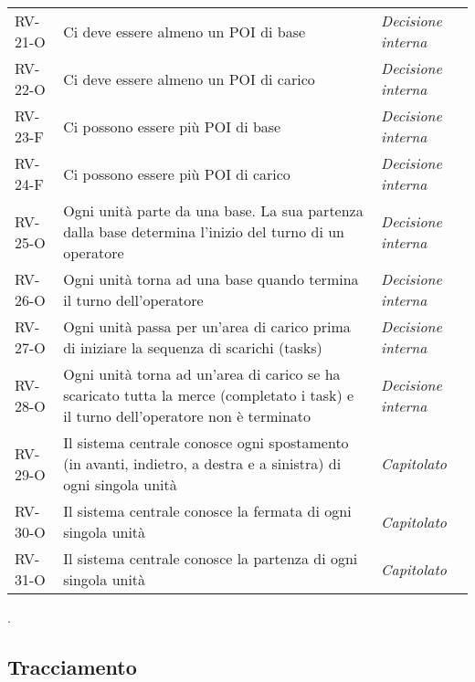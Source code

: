 \begin{longtable}{ 
		>{\centering}p{} 
		>{}p{}
		>{\centering \it}p{} }
RV-21-O & Ci deve essere almeno un POI di base & Decisione interna\tabularnewline
RV-22-O & Ci deve essere almeno un POI di carico & Decisione interna\tabularnewline
RV-23-F & Ci possono essere più POI di base & Decisione interna\tabularnewline
RV-24-F & Ci possono essere più POI di carico & Decisione interna\tabularnewline
RV-25-O & Ogni unità parte da una base. La sua partenza dalla base determina l'inizio del turno di un operatore & Decisione interna\tabularnewline
RV-26-O & Ogni unità torna ad una base quando termina il turno dell’operatore & Decisione interna\tabularnewline
RV-27-O & Ogni unità passa per un’area di carico prima di iniziare la sequenza di scarichi (tasks) & Decisione interna\tabularnewline
RV-28-O & Ogni unità torna ad un'area di carico se ha scaricato tutta la merce (completato i task) e il turno dell’operatore non è terminato & Decisione interna\tabularnewline
RV-29-O & Il sistema centrale conosce ogni spostamento (in avanti, indietro, a destra e a sinistra) di ogni singola unità & Capitolato\tabularnewline
RV-30-O & Il sistema centrale conosce la fermata di ogni singola unità & Capitolato\tabularnewline
RV-31-O & Il sistema centrale conosce la partenza di ogni singola unità & Capitolato\tabularnewline
\end{longtable}.
\newline
\newline
\subsection{Tracciamento}
